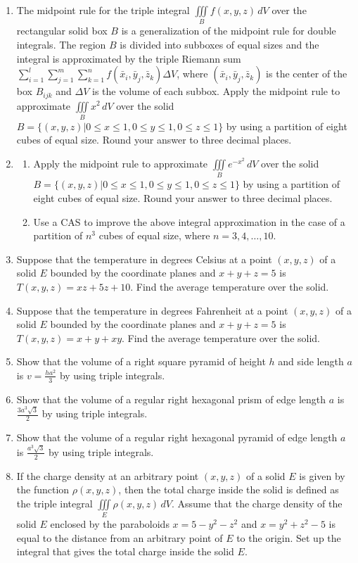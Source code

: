 \documentclass{exercises}
\begin{document}
\begin{enumerate}[resume]
\item The midpoint rule for the triple integral $\underset{B}{\iiint}f(x,y,z)\,dV$ over the rectangular solid box $B$ is a generalization of the midpoint rule for double integrals. The region $B$ is divided into subboxes of equal sizes and the integral is approximated by the triple Riemann sum $\sum_{i=1}^{l}\sum_{j=1}^{m}\sum_{k=1}^{n}f(\bar{x}_{i},\bar{y}_{j},\bar{z}_{k})\Delta V$, where $(\bar{x}_{i},\bar{y}_{j},\bar{z}_{k})$ is the center of the box $B_{ijk}$ and $\Delta V$ is the volume of each subbox. Apply the midpoint rule to approximate $\underset{B}{\iiint}x^{2}\,dV$ over the solid $B=\{(x,y,z)|0\le x\le1,0\le y\le1,0\le z\le1\}$ by using a partition of eight cubes of equal size. Round your answer to three decimal places.
\item \techrequired
\begin{enumerate}[label=(\alph*)]
  \item Apply the midpoint rule to approximate $\underset{B}{\iiint}e^{-x^{2}}\,dV$ over the solid $B=\{(x,y,z)|0\le x\le1,0\le y\le1,0\le z\le1\}$ by using a partition of eight cubes of equal size. Round your answer to three decimal places.
  \item Use a CAS to improve the above integral approximation in the case of a partition of $n^{3}$ cubes of equal size, where $n=3,4,\ldots,10$.
\end{enumerate}
\item Suppose that the temperature in degrees Celsius at a point $(x,y,z)$ of a solid $E$ bounded by the coordinate planes and $x+y+z=5$ is $T(x,y,z)=xz+5z+10$. Find the average temperature over the solid.
\item Suppose that the temperature in degrees Fahrenheit at a point $(x,y,z)$ of a solid $E$ bounded by the coordinate planes and $x+y+z=5$ is $T(x,y,z)=x+y+xy$. Find the average temperature over the solid.
\item Show that the volume of a right square pyramid of height $h$ and side length $a$ is $v=\frac{ha^{2}}{3}$ by using triple integrals.
\item Show that the volume of a regular right hexagonal prism of edge length $a$ is $\frac{3a^{3}\sqrt{3}}{2}$ by using triple integrals.
\item Show that the volume of a regular right hexagonal pyramid of edge length $a$ is $\frac{a^{3}\sqrt{3}}{2}$ by using triple integrals.
\item If the charge density at an arbitrary point $(x,y,z)$ of a solid $E$ is given by the function $\rho(x,y,z)$, then the total charge inside the solid is defined as the triple integral $\underset{E}{\iiint}\rho(x,y,z)\,dV$. Assume that the charge density of the solid $E$ enclosed by the paraboloids $x=5-y^{2}-z^{2}$ and $x=y^{2}+z^{2}-5$ is equal to the distance from an arbitrary point of $E$ to the origin. Set up the integral that gives the total charge inside the solid $E$.
\end{enumerate}
\end{document}
